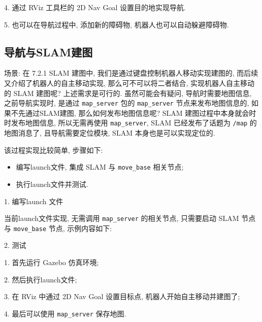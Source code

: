 \documentclass[openany, fontset=windowsold]{ctexbook}
\theoremstyle{kaiti}
\theoremstyle{normal}
\begin{document}
4. 通过 RViz 工具栏的 2D Nav Goal 设置目的地实现导航.

5. 也可以在导航过程中, 添加新的障碍物, 机器人也可以自动躲避障碍物.

\subsection{导航与SLAM建图}

场景: 在 7.2.1 SLAM 建图中, 我们是通过键盘控制机器人移动实现建图的, 而后续又介绍了机器人的自主移动实现, 那么可不可以将二者结合, 实现机器人自主移动的 SLAM 建图呢? 上述需求是可行的. 虽然可能会有疑问, 导航时需要地图信息, 之前导航实现时, 是通过 \verb|map_server| 包的 \verb|map_server| 节点来发布地图信息的, 如果不先通过SLAM建图, 那么如何发布地图信息呢? SLAM 建图过程中本身就会时时发布地图信息, 所以无需再使用 \verb|map_server|, SLAM 已经发布了话题为 \verb|/map| 的地图消息了, 且导航需要定位模块, SLAM 本身也是可以实现定位的.

该过程实现比较简单, 步骤如下:

\begin{itemize}
  \item 编写launch文件, 集成 SLAM 与 \verb|move_base| 相关节点; 
  \item 执行launch文件并测试.
\end{itemize}

1. 编写launch 文件

当前launch文件实现, 无需调用 \verb|map_server| 的相关节点, 只需要启动 SLAM 节点与 \verb|move_base| 节点, 示例内容如下:


2. 测试

1. 首先运行 Gazebo 仿真环境; 

2. 然后执行launch文件; 

3. 在 RViz 中通过 2D Nav Goal 设置目标点, 机器人开始自主移动并建图了; 

4. 最后可以使用 \verb|map_server| 保存地图.
\end{document}
